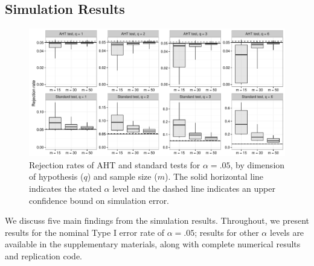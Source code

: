 \documentclass[12pt]{article}\usepackage[]{graphicx}\usepackage[]{color}
\newenvironment{knitrout}{}{} %
\begin{document}
\subsection{Simulation Results}

\begin{knitrout}
\color{fgcolor}\begin{figure}

{\centering \includegraphics[width=\linewidth]{CR_fig/overview-1} 

}

\caption[Rejection rates of AHT and standard tests for $\alpha = .05$, by dimension of hypothesis ($q$) and sample size ($m$)]{Rejection rates of AHT and standard tests for $\alpha = .05$, by dimension of hypothesis ($q$) and sample size ($m$). The solid horizontal line indicates the stated $\alpha$ level and the dashed line indicates an upper confidence bound on simulation error.}\label{fig:overview}
\end{figure}


\end{knitrout}

We discuss five main findings from the simulation results.
Throughout, we present results for the nominal Type I error rate of $\alpha = .05$; results for other $\alpha$ levels are available in the supplementary materials, along with complete numerical results and replication code.
\end{document}
